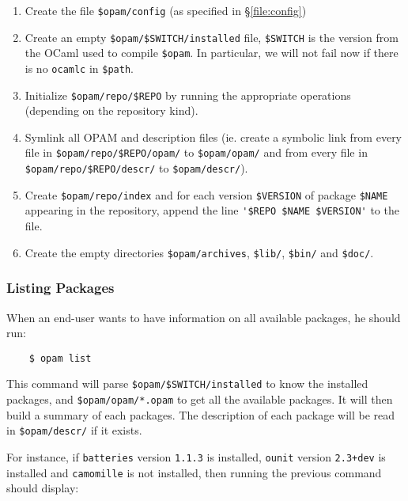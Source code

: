 \documentclass[a4paper,11pt]{article}
\begin{document}
\begin{enumerate}

\item Create the file \verb+$opam/config+ (as specified in
  \S\ref{file:config})

\item Create an empty \verb+$opam/$SWITCH/installed+ file,
  \verb+$SWITCH+ %
  is the version from the OCaml used to compile \verb+$opam+.
  In particular, we will not fail now
  if there is no \verb+ocamlc+ in \verb+$path+.

\item Initialize \verb+$opam/repo/$REPO+ by running the
  appropriate operations (depending on the repository kind).

\item Symlink all OPAM and description files (ie. create a symbolic
  link from every file in \verb+$opam/repo/$REPO/opam/+ to
  \verb+$opam/opam/+ and from every file in
  \verb+$opam/repo/$REPO/descr/+ to \verb+$opam/descr/+).

\item Create \verb+$opam/repo/index+ and for each version
  \verb+$VERSION+ of package \verb+$NAME+ appearing in the repository,
  append the line \verb+'$REPO $NAME $VERSION'+ to the file.

\item Create the empty directories \verb+$opam/archives+,
  \verb+$lib/+, \verb+$bin/+ and \verb+$doc/+.

\end{enumerate}

\subsubsection{Listing Packages}
\label{opam-list}

When an end-user wants to have information on all available packages,
he should run:

\begin{verbatim}
    $ opam list
\end{verbatim}

This command will parse \verb+$opam/$SWITCH/installed+ to know the
installed packages, and \verb+$opam/opam/*.opam+ to get all the
available packages. It will then build a summary of each packages. The
description of each package will be read in \verb+$opam/descr/+ if it
exists.

For instance, if {\tt batteries} version {\tt 1.1.3} is installed,
{\tt ounit} version {\tt 2.3+dev} is installed and {\tt camomille} is
not installed, then running the previous command should display:
\end{document}
